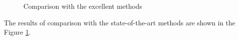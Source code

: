 \documentclass[fleqn,10pt]{wlscirep}
\begin{document}
\begin{figure}[ht]
\centering
{}
\caption{Comparison with the excellent methods}
\label{Fig.lable3}
\end{figure}

The results of comparison with the state-of-the-art methods are shown in the Figure \ref{Fig.lable3}.
\end{document}
